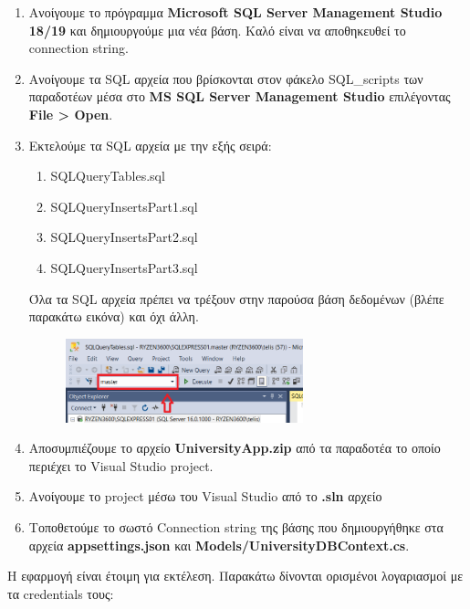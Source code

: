 \documentclass[12pt]{article}
\begin{document}
\begin{enumerate}
	\item Ανοίγουμε το πρόγραμμα \textbf{Microsoft SQL Server Management Studio 18/19} και δημιουργούμε μια νέα βάση. Καλό είναι να αποθηκευθεί το connection string.
	
	\item Ανοίγουμε τα SQL αρχεία που βρίσκονται στον φάκελο SQL\_scripts των παραδοτέων μέσα στο \textbf{MS SQL Server Management Studio} επιλέγοντας \textbf{File > Open}.
	
	\item Εκτελούμε τα SQL αρχεία με την εξής σειρά: 
	\begin{enumerate}
		\item SQLQueryTables.sql
		\item SQLQueryInsertsPart1.sql
		\item SQLQueryInsertsPart2.sql
		\item SQLQueryInsertsPart3.sql
	\end{enumerate}

	Όλα τα SQL αρχεία πρέπει να τρέξουν στην παρούσα βάση δεδομένων (βλέπε παρακάτω εικόνα) και όχι άλλη.
	
	\begin{figure}[H]
		\centering
		\includegraphics[width=0.65\textwidth]{sqls.png}
		\caption{}
	\end{figure}
	
	\item Αποσυμπιέζουμε το αρχείο \textbf{UniversityApp.zip} από τα παραδοτέα το οποίο περιέχει το Visual Studio project.
	
	\item Ανοίγουμε το project μέσω του Visual Studio από το \textbf{.sln} αρχείο
	
	\item Τοποθετούμε το σωστό Connection string της βάσης που δημιουργήθηκε στα αρχεία \textbf{appsettings.json} και \textbf{Models/UniversityDBContext.cs}.
	
\end{enumerate}


Η εφαρμογή είναι έτοιμη για εκτέλεση. Παρακάτω δίνονται ορισμένοι λογαριασμοί με τα credentials τους:
\end{document}
